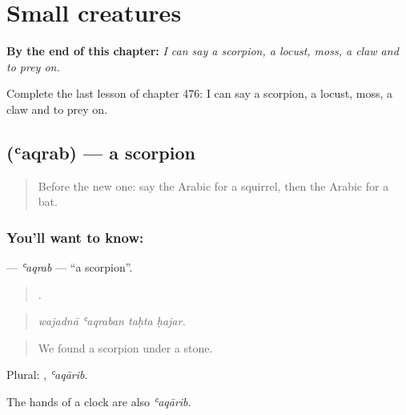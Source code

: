
\chapter{Small creatures}
\label{ch:ar-small-creatures}

\begin{chapteropening}
\textbf{By the end of this chapter:} \emph{I can say a scorpion, a locust, moss, a claw and to prey on.}

Complete the last lesson of chapter 476: I can say a scorpion, a locust, moss, a claw and to prey on.
\end{chapteropening}

\section[\texorpdfstring{\ar{عقرب} (ʿaqrab)}{عقرب (ʿaqrab)}]{ (ʿaqrab) — a scorpion}

\label{lesson:AR-C476-aqrab}



\begin{quote}
Before the new one: say the Arabic for a squirrel, then the Arabic for a bat.
\end{quote}

\subsection*{You'll want to know: }
\textbf{} — \emph{ʿaqrab} — \textquotedblleft{}a scorpion\textquotedblright{}.

\begin{quote}
   .
\end{quote}

\begin{quote}
\emph{wajadnā ʿaqraban taḥta ḥajar.}
\end{quote}

\begin{quote}
We found a scorpion under a stone.
\end{quote}

Plural: , \emph{ʿaqārib}.

The hands of a clock are also \emph{ʿaqārib}.

